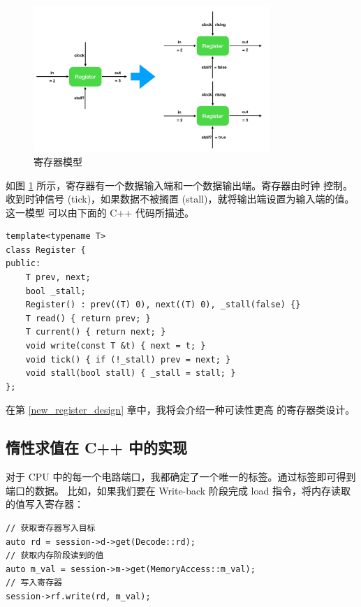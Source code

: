 \documentclass[12pt]{article}
\begin{document}
    \begin{figure}[h]
        \centering
        \includegraphics[width=0.8\textwidth]{register}
        \caption{寄存器模型}
        \label{fig:register}
    \end{figure}

    如图 \ref{fig:register} 所示，寄存器有一个数据输入端和一个数据输出端。寄存器由时钟
    控制。收到时钟信号 (tick)，如果数据不被搁置 (stall)，就将输出端设置为输入端的值。这一模型
    可以由下面的 C++ 代码所描述。

    \begin{verbatim}
template<typename T>
class Register {
public:
    T prev, next;
    bool _stall;
    Register() : prev((T) 0), next((T) 0), _stall(false) {}
    T read() { return prev; }
    T current() { return next; }
    void write(const T &t) { next = t; }
    void tick() { if (!_stall) prev = next; }
    void stall(bool stall) { _stall = stall; }
};
    \end{verbatim}
    \begin{tcolorbox}
        在第 \ref{new_register_design} 章中，我将会介绍一种可读性更高
        的寄存器类设计。
    \end{tcolorbox}

    \subsection{惰性求值在 C++ 中的实现}

    对于 CPU 中的每一个电路端口，我都确定了一个唯一的标签。通过标签即可得到端口的数据。
    比如，如果我们要在 Write-back 阶段完成 load 指令，将内存读取的值写入寄存器：
    \begin{verbatim}
// 获取寄存器写入目标
auto rd = session->d->get(Decode::rd);
// 获取内存阶段读到的值
auto m_val = session->m->get(MemoryAccess::m_val);
// 写入寄存器
session->rf.write(rd, m_val);
    \end{verbatim}
\end{document}

